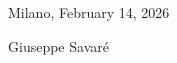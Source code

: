 \documentclass[reqno,11pt]{article}
\theoremstyle{plain}
\begin{document}

\vspace{.5truecm}
Milano, February 14, 2026

\begin{center}
  Giuseppe Savar\'e
\end{center}
\newpage

\nocite{*}
{\renewcommand{\markboth}[2]{}%
\printbibliography[title={List of publications}]}
\end{document}
